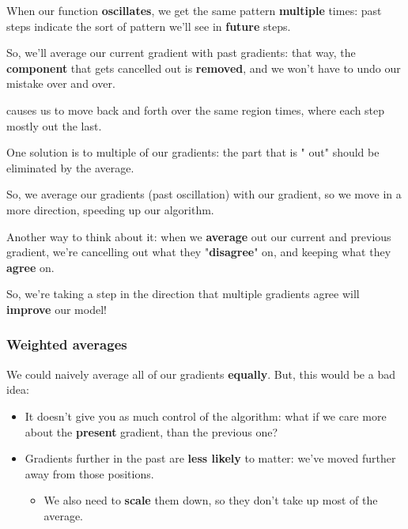             When our function \textbf{oscillates}, we get the same pattern \textbf{multiple} times: past steps indicate the sort of pattern we'll see in \textbf{future} steps. 
            
            So, we'll average our current gradient with past gradients: that way, the \textbf{component} that gets cancelled out is \textbf{removed}, and we won't have to undo our mistake over and over.\\
            
            \begin{concept}
                 causes us to move back and forth over the same region  times, where each step mostly  out the last.
                
                One solution is to  multiple of our gradients: the part that is " out" should be eliminated by the average.
                
                So, we average our  gradients (past oscillation) with our  gradient, so we move in a more  direction, speeding up our algorithm.
            \end{concept}
            
            Another way to think about it: when we \textbf{average} out our current and previous gradient, we're cancelling out what they "\textbf{disagree}" on, and keeping what they \textbf{agree} on.
            
            So, we're taking a step in the direction that multiple gradients agree will \textbf{improve} our model!
            
        
        \subsecdiv
            
        \subsubsection{Weighted averages}
        
            We could naively average all of our gradients \textbf{equally}. But, this would be a bad idea:
            
            \begin{itemize}
                \item It doesn't give you as much control of the algorithm: what if we care more about the \textbf{present} gradient, than the previous one?
                \item Gradients further in the past are \textbf{less likely} to matter: we've moved further away from those positions.
                    \begin{itemize}
                        \item We also need to \textbf{scale} them down, so they don't take up most of the average.
                    \end{itemize}
            \end{itemize}
            
